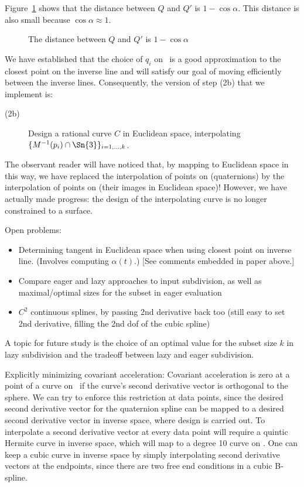 Figure~\ref{fig:QQdist} shows that the 
distance between $Q$ and $Q'$ is $1-\cos \alpha$.
This distance is also small because $\cos \alpha \approx 1$.
\QED

\begin{figure}
\vspace{2.5in}
\caption{The distance between $Q$ and $Q'$ is $1-\cos\alpha$}
\label{fig:QQdist}
\end{figure}

We have established that the choice of $q_i$ on \ is a good
approximation to the closest point on the inverse line
and will satisfy our goal of moving efficiently between the inverse lines.
Consequently, the version of step (2b) that we implement is:
%
\begin{description}
\item[(2b)]
	Design a rational curve $C$ in Euclidean space,
	interpolating $\{M^{-1}(p_i) \cap \Sn{3}\}_{i=1,\ldots,k}$.
\end{description}

The observant reader will have noticed that, by mapping to Euclidean
space in this way, we have replaced the
interpolation of points on  (quaternions) by the interpolation
of points on  (their images in Euclidean space)!
However, we have actually made progress:
the design of the interpolating curve is no longer constrained to
a surface.

Open problems:
\begin{itemize}
\item
	Determining tangent in Euclidean space when using closest point on inverse line.
		(Involves computing $\alpha(t)$.)
		[See comments embedded in paper above.]
\item
	Compare eager and lazy approaches to input subdivision,
	   as well as maximal/optimal sizes for the subset in eager evaluation
\item	
	$C^2$ continuous splines, by passing 2nd derivative back too
		(still easy to set 2nd derivative, filling the 2nd dof of the cubic spline)
\end{itemize}		

A topic for future study is the choice of an optimal value
for the subset size $k$ in lazy subdivision 
and the tradeoff between lazy and eager subdivision.




Explicitly minimizing covariant acceleration:
Covariant acceleration is zero at a point of a curve on \ if the curve's
second derivative vector is orthogonal to the sphere.
We can try to enforce this restriction at data points,
since the desired second derivative vector for the quaternion spline
can be mapped to a desired second derivative vector in inverse space,
where design is carried out.
To interpolate a second derivative vector at every data point will require
a quintic Hermite curve in inverse space, which will map to a degree 10
curve on .
One can keep a cubic curve in inverse space by simply interpolating
second derivative vectors at the endpoints, since there are two free
end conditions in a cubic B-spline.


